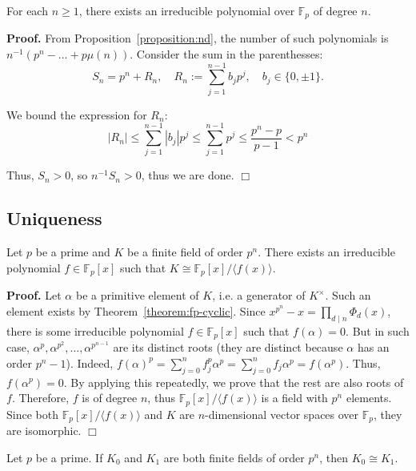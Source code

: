 \documentclass{template}
\newcommand{\qedwhite}{\hfill \ensuremath{\Box}}
\begin{document}
\begin{theorem}
    For each $n \geq 1$, there exists an irreducible polynomial over
    $\mathbb{F}_p$ of degree $n$.
\end{theorem}

\textbf{Proof.} From Proposition~\ref{proposition:nd}, the number of such
polynomials is $n^{-1}(p^n-\dots + p\mu(n))$. Consider the sum in 
the parenthesses:
\begin{equation*}
    S_n = p^n + R_n, \quad R_n := \sum_{j=1}^{n-1}b_jp^j, \quad b_j \in \{0,\pm 1\}.
\end{equation*}

We bound the expression for $R_n$:
\begin{equation*}
    |R_n| \leq \sum_{j=1}^{n-1}|b_j|p^j \leq \sum_{j=1}^{n-1}p^j \leq \frac{p^n-p}{p-1} < p^n
\end{equation*}

Thus, $S_n>0$, so $n^{-1}S_n>0$, thus we are done. \qedwhite

\subsection{Uniqueness}

\begin{lemma}\label{lemma:minimal}
    Let $p$ be a prime and $K$ be a finite field of order $p^n$. There exists an
    irreducible polynomial $f \in \mathbb{F}_p[x]$ such that $K \cong
    \mathbb{F}_p[x]/\langle f(x) \rangle$. 
\end{lemma}

\textbf{Proof.} Let $\alpha$ be a primitive element of $K$, i.e. a generator of
$K^{\times}$. Such an element exists by Theorem~\ref{theorem:fp-cyclic}. Since
$x^{p^n}-x=\prod_{d \mid n}\Phi_d(x)$, there is some irreducible polynomial $f
\in \mathbb{F}_p[x]$ such that $f(\alpha)=0$. But in such case, $\alpha^p,
\alpha^{p^2},\dots,\alpha^{p^{n-1}}$ are its distinct roots (they are distinct
because $\alpha$ has an order $p^n-1$). Indeed, $f(\alpha)^p = \sum_{j=0}^n
f_j^p\alpha^p = \sum_{j=0}^n f_j\alpha^p = f(\alpha^p)$. Thus, $f(\alpha^p)=0$.
By applying this repeatedly, we prove that the rest are also roots of $f$.
Therefore, $f$ is of degree $n$, thus $\mathbb{F}_p[x]/\langle f(x) \rangle$ is
a field with $p^n$ elements. Since both $\mathbb{F}_p[x]/\langle f(x) \rangle$
and $K$ are $n$-dimensional vector spaces over $\mathbb{F}_p$, they are
isomorphic. \qedwhite

\begin{theorem}
    Let $p$ be a prime. If $K_0$ and $K_1$ are both finite fields 
    of order $p^n$, then $K_0 \cong K_1$.
\end{theorem}
\end{document}
